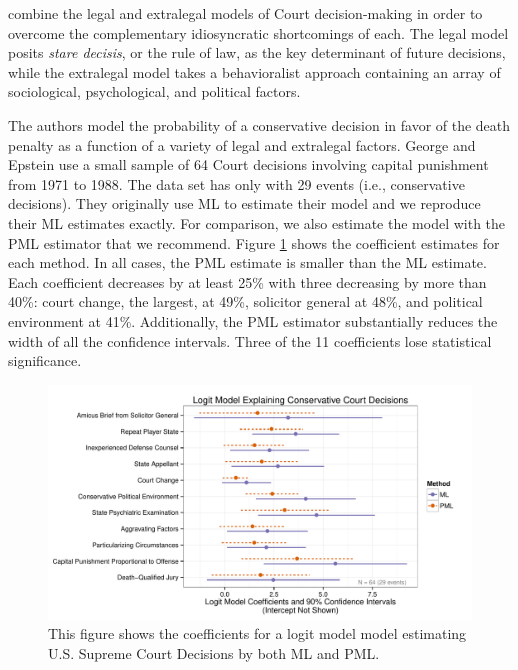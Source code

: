 \documentclass[12pt]{article}
\begin{document}
\cite{GeorgeEpstein1992} combine the legal and extralegal models of Court decision-making in order to overcome the complementary idiosyncratic shortcomings of each.
The legal model posits \emph{stare decisis}, or the rule of law, as the key determinant of future decisions, while the extralegal model takes a behavioralist approach containing an array of sociological, psychological, and political factors.

The authors model the probability of a conservative decision in favor of the death penalty as a function of a variety of legal and extralegal factors. 
George and Epstein use a small sample of 64 Court decisions involving capital punishment from 1971 to 1988. 
The data set has only with 29 events (i.e., conservative decisions).
They originally use ML to estimate their model and we reproduce their ML estimates exactly.
For comparison, we also estimate the model with the PML estimator that we recommend.
Figure \ref{fig:ge-coefs} shows the coefficient estimates for each method.
In all cases, the PML estimate is smaller than the ML estimate.
Each coefficient decreases by at least 25\% with three decreasing by more than 40\%: court change, the largest, at 49\%, solicitor general at 48\%, and political environment at 41\%.
Additionally, the PML estimator substantially reduces the width of all the confidence intervals.
Three of the 11 coefficients lose statistical significance.

\begin{figure}[h]
\begin{center}
\includegraphics[width = \textwidth]{figs/ge-coefs.pdf}
\caption{This figure shows the coefficients for a logit model model estimating U.S. Supreme Court Decisions by both ML and PML.}\label{fig:ge-coefs}
\end{center}
\end{figure}
\end{document}
